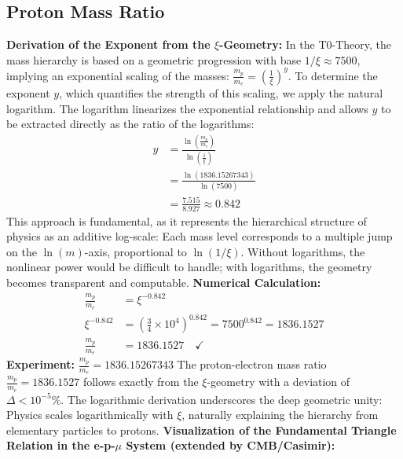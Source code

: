 	\subsection{Proton Mass Ratio}
	\textbf{Derivation of the Exponent from the $\xi$-Geometry:}
	In the T0-Theory, the mass hierarchy is based on a geometric progression with base $1/\xi \approx 7500$, implying an exponential scaling of the masses: $\frac{m_p}{m_e} = \left(\frac{1}{\xi}\right)^y$. To determine the exponent $y$, which quantifies the strength of this scaling, we apply the natural logarithm. The logarithm linearizes the exponential relationship and allows $y$ to be extracted directly as the ratio of the logarithms:
	\begin{align}
		y &= \frac{\ln \left( \frac{m_p}{m_e} \right)}{\ln \left( \frac{1}{\xi} \right)} \\
		&= \frac{\ln (1836.15267343)}{\ln (7500)} \\
		&= \frac{7.515}{8.927} \approx 0.842
	\end{align}
	This approach is fundamental, as it represents the hierarchical structure of physics as an additive log-scale: Each mass level corresponds to a multiple jump on the $\ln(m)$-axis, proportional to $\ln(1/\xi)$. Without logarithms, the nonlinear power would be difficult to handle; with logarithms, the geometry becomes transparent and computable.
	\textbf{Numerical Calculation:}
	\begin{align}
		\frac{m_p}{m_e} &= \xi^{-0.842} \\
		\xi^{-0.842} &= \left( \frac{3}{4} \times 10^{4} \right)^{0.842} = 7500^{0.842} = 1836.1527 \\
		\frac{m_p}{m_e} &= 1836.1527 \quad \checkmark
	\end{align}
	\textbf{Experiment:} $\frac{m_p}{m_e} = 1836.15267343$
	The proton-electron mass ratio $\frac{m_p}{m_e} = 1836.1527$ follows exactly from the $\xi$-geometry with a deviation of $\Delta < 10^{-5}\%$. The logarithmic derivation underscores the deep geometric unity: Physics scales logarithmically with $\xi$, naturally explaining the hierarchy from elementary particles to protons.
	\textbf{Visualization of the Fundamental Triangle Relation in the e-p-$\mu$ System (extended by CMB/Casimir):}
